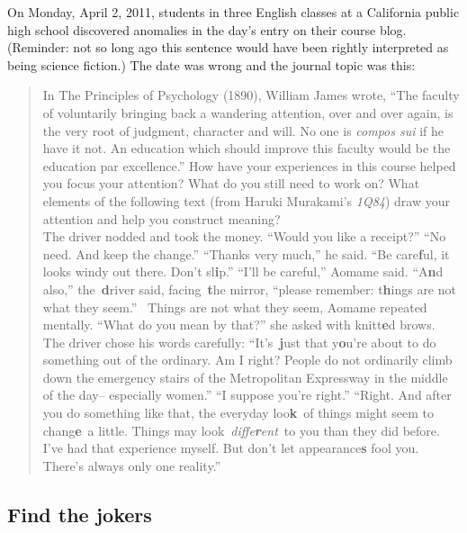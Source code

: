 On Monday, April 2, 2011, students in three English classes at a
California public high school discovered anomalies in the day's entry on
their course blog. (Reminder: not so long ago this sentence would have
been rightly interpreted as being science fiction.) The date was wrong
and the journal topic was this:

\begin{quote}
In The Principles of Psychology (1890), William James wrote, ``The
faculty of voluntarily bringing back a wandering attention, over and
over again, is the very root of judgment, character and will. No one is
\emph{compos sui} if he have it not. An education which should improve
this faculty would be the education par excellence.'' How have your
experiences in this course helped you focus your attention? What do you
still need to work on? What elements of the following text (from Haruki
Murakami's \emph{1Q84}) draw your attention and help you construct
meaning?\\[.2cm]
The driver nodded and took the money. ``Would you like a
receipt?'' ``No need. And keep the change.'' ``Thanks very much,'' he
said. ``Be care\textbf{f}ul, it looks windy out there. Don't
sl\textbf{i}p.'' ``I'll be careful,'' Aomame said. ``A\textbf{n}d
also,'' the~\textbf{d}river said, facing~\textbf{t}he mirror, ``please
remember: t\textbf{h}ings are not what they seem.''~ Things are not what
they seem, Aomame repeated mentally. ``What do you mean by that?'' she
asked with knitt\textbf{e}d brows. The driver chose his words carefully:
``It's~\textbf{j}ust that y\textbf{o}u're about to do something out of
the ordinary. Am I right? People do not ordinarily climb down the
emergency stairs of the Metropolitan Expressway in the middle of the
day-- especially women.'' ``I suppose you're right.'' ``Right. And after
you do something like that, the everyday loo\textbf{k}~of things might
seem to chang\textbf{e}~a little. Things may
look~\emph{diffe\textbf{r}ent}~to you than they did before. I've had
that experience myself. But don't let appearance\textbf{s} fool you.
There's always only one reality.''
\end{quote}

\subsection{Find the jokers}\label{find-the-jokers}

